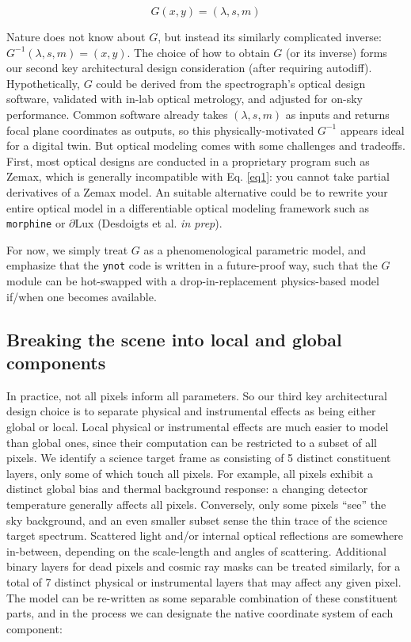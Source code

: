 \documentclass[twocolumn]{aastex631}
\begin{document}
\begin{equation}
  G(x,y) = (\lambda, s, m)
\end{equation}

Nature does not know about $G$, but instead its similarly complicated inverse: $G^{-1}(\lambda, s, m) = (x,y)$.  The choice of how to obtain $G$ (or its inverse) forms our second key architectural design consideration (after requiring autodiff).  Hypothetically, $G$ could be derived from the spectrograph's optical design software, validated with in-lab optical metrology, and adjusted for on-sky performance. Common software already takes $(\lambda, s, m)$ as inputs and returns focal plane coordinates as outputs, so this physically-motivated $G^{-1}$ appears ideal for a digital twin. But optical modeling comes with some challenges and tradeoffs.  First, most optical designs are conducted in a proprietary program such as Zemax\texttrademark, which is generally incompatible with Eq. \ref{eq1}: you cannot take partial derivatives of a Zemax model.  An suitable alternative could be to rewrite your entire optical model in a differentiable optical modeling framework such as \texttt{morphine} \citep{2021ApJ...907...40P} or $\partial{\mathrm{Lux}}$ (Desdoigts et al. \emph{in prep}).

For now, we simply treat $G$ as a phenomenological parametric model, and emphasize that the \texttt{ynot} code is written in a future-proof way, such that the $G$ module can be hot-swapped with a drop-in-replacement physics-based model if/when one becomes available.


\subsection{Breaking the scene into local and global components}
In practice, not all pixels inform all parameters.  So our third key architectural design choice is to separate physical and instrumental effects as being either global or local.  Local physical or instrumental effects are much easier to model than global ones, since their computation can be restricted to a subset of all pixels.  We identify a science target frame as consisting of 5 distinct constituent layers, only some of which touch all pixels.  For example, all pixels exhibit a distinct global bias and thermal background response: a changing detector temperature generally affects all pixels.  Conversely, only some pixels ``see'' the sky background, and an even smaller subset sense the thin trace of the science target spectrum.  Scattered light and/or internal optical reflections are somewhere in-between, depending on the scale-length and angles of scattering.  Additional binary layers for dead pixels and cosmic ray masks can be treated similarly, for a total of 7 distinct physical or instrumental layers that may affect any given pixel.  The model can be re-written as some separable combination of these constituent parts, and in the process we can designate the native coordinate system of each component:
\end{document}
